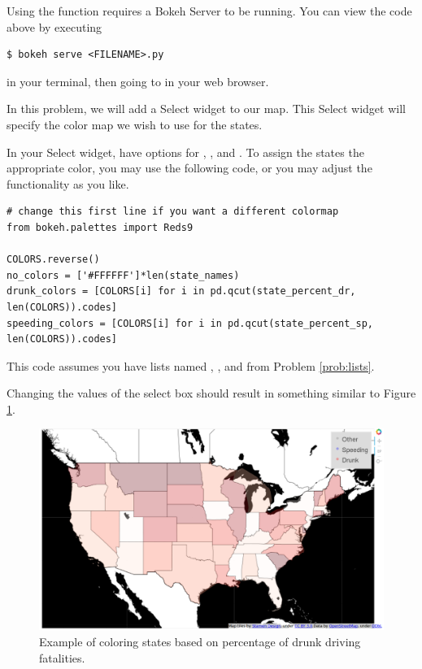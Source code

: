 Using the  function requires a Bokeh Server to be running.
You can view the code above by executing
\begin{lstlisting}
$ bokeh serve <FILENAME>.py
\end{lstlisting}
in your terminal, then going to  in your web
browser.

\begin{problem}
In this problem, we will add a Select widget to our map. This Select widget will
specify the color map we wish to use for the states.

In your Select widget, have options for , , and
. To assign the states the appropriate color, you may use
the following code, or you may adjust the functionality as you like.

\begin{lstlisting}
# change this first line if you want a different colormap
from bokeh.palettes import Reds9

COLORS.reverse()
no_colors = ['#FFFFFF']*len(state_names)
drunk_colors = [COLORS[i] for i in pd.qcut(state_percent_dr, len(COLORS)).codes]
speeding_colors = [COLORS[i] for i in pd.qcut(state_percent_sp, len(COLORS)).codes]
\end{lstlisting}

This code assumes you have lists named , ,
and  from Problem \ref{prob:lists}.

Changing the values of the select box should result in something similar to
Figure \ref{fig:select}.
\end{problem}

\begin{figure}
    \includegraphics[width=.7\linewidth]{BokehFigs/color_states.png}
    \caption{Example of coloring states based on percentage of drunk
            driving fatalities.}
    \label{fig:select}
\end{figure}


